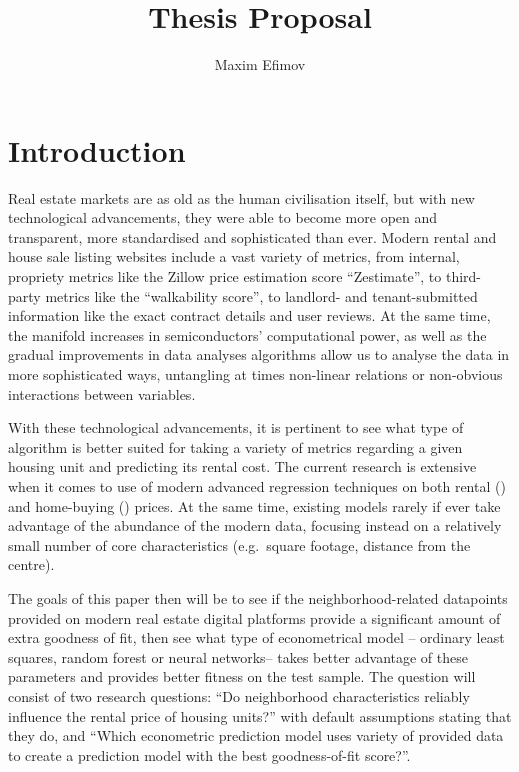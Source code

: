 \documentclass[12pt]{report}
\title{Thesis Proposal}
\author{Maxim Efimov}
\begin{document}
\maketitle

\section{Introduction}

Real estate markets are as old as the human civilisation itself, but with new technological advancements, they were able to become more open and transparent, more standardised and sophisticated than ever. Modern rental and house sale listing websites include a vast variety of metrics, from internal, propriety metrics like the Zillow price estimation score “Zestimate”, to third-party metrics like the “walkability score”, to landlord- and tenant-submitted information like the exact contract details and user reviews. At the same time, the manifold increases in semiconductors’ computational power, as well as the gradual improvements in data analyses algorithms allow us to analyse the data in more sophisticated ways, untangling at times non-linear relations or non-obvious interactions between variables.

With these technological advancements, it is pertinent to see what type of algorithm is better suited for taking a variety of metrics regarding a given housing unit and predicting its rental cost. The current research is extensive when it comes to use of modern advanced regression techniques on both rental (\cite{neloy2019}) and home-buying (\cite{Shahhosseini2001}) prices. At the same time, existing models rarely if ever take advantage of the abundance of the modern data, focusing instead on a relatively small number of core characteristics (e.g.\ square footage, distance from the centre).

The goals of this paper then will be to see if the neighborhood-related datapoints provided on modern real estate digital platforms provide a significant amount of extra goodness of fit, then see what type of econometrical model – ordinary least squares, random forest or neural networks– takes better advantage of these parameters and provides better fitness on the test sample. The question will consist of two research questions: “Do neighborhood characteristics reliably influence the rental price of housing units?”  with default assumptions stating that they do, and “Which econometric prediction model uses variety of provided data to create a prediction model with the best goodness-of-fit score?”.
\end{document}

